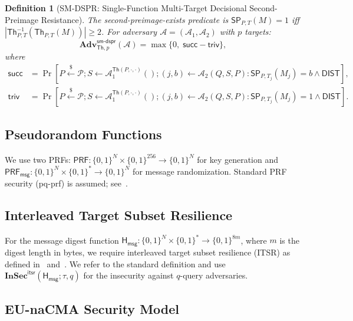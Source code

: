 \documentclass[11pt,a4paper]{article}
\newtheorem{definition}[theorem]{Definition}
\newcommand{\Th}{\mathsf{Th}}
\newcommand{\bits}{\{0,1\}}
\newcommand{\PRF}{\mathsf{PRF}}
\newcommand{\PRFmsg}{\mathsf{PRF}_{\mathsf{msg}}}
\newcommand{\Hmsg}{\mathsf{H}_{\mathsf{msg}}}
\newcommand{\InSec}[1]{\mathbf{InSec}^{\mathsf{#1}}}
\newcommand{\Adv}{\mathbf{Adv}}
\newcommand{\Nbits}{N}
\begin{document}
\begin{definition}[SM-DSPR: Single-Function Multi-Target Decisional Second-Preimage Resistance]
\label{def:sm-dspr}
The second-preimage-exists predicate is $\mathsf{SP}_{P,T}(M) = 1$ iff $|\Th_{P,T}^{-1}(\Th_{P,T}(M))| \ge 2$. For adversary $\mathcal{A}=(\mathcal{A}_1,\mathcal{A}_2)$ with $p$ targets:
\[
\Adv_{\Th,p}^{\mathsf{sm\text{-}dspr}}(\mathcal{A}) = \max\{0,\; \mathsf{succ} - \mathsf{triv}\},
\]
where
\begin{align*}
\mathsf{succ} &= \Pr[P \xleftarrow{\$} \mathcal{P}; S \gets \mathcal{A}_1^{\Th(P,\cdot,\cdot)}(); (j,b) \gets \mathcal{A}_2(Q,S,P) : \mathsf{SP}_{P,T_j}(M_j) = b \land \mathsf{DIST}],\\
\mathsf{triv} &= \Pr[P \xleftarrow{\$} \mathcal{P}; S \gets \mathcal{A}_1^{\Th(P,\cdot,\cdot)}(); (j,b) \gets \mathcal{A}_2(Q,S,P) : \mathsf{SP}_{P,T_j}(M_j) = 1 \land \mathsf{DIST}].
\end{align*}
\end{definition}

\subsection{Pseudorandom Functions}

We use two PRFs: $\PRF : \bits^\Nbits \times \bits^{256} \to \bits^\Nbits$ for key generation and $\PRFmsg : \bits^\Nbits \times \bits^* \to \bits^\Nbits$ for message randomization. Standard PRF security (pq-prf) is assumed; see~\cite{HK22}.

\subsection{Interleaved Target Subset Resilience}

For the message digest function $\Hmsg : \bits^\Nbits \times \bits^* \to \bits^{8m}$, where $m$ is the digest length in bytes, we require interleaved target subset resilience (ITSR) as defined in~\cite[Definition~18]{BHK+19} and~\cite{HK22}. We refer to the standard definition and use $\InSec{itsr}(\Hmsg; \tau, q)$ for the insecurity against $q$-query adversaries.

\subsection{EU-naCMA Security Model}
\label{sec:eunacma}
\end{document}
